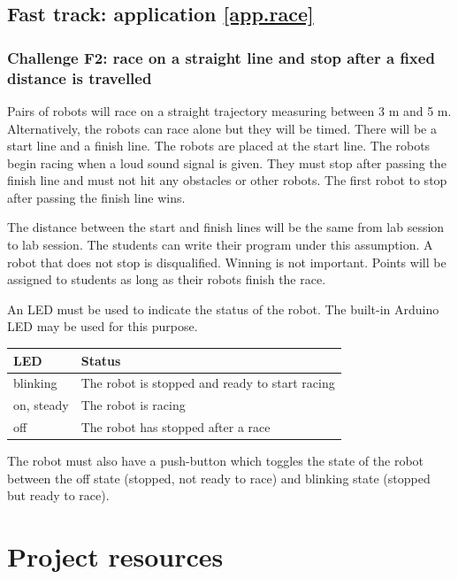 \documentclass[12pt]{book}
\begin{document}
\section{Fast track: application \ref{app.race}}

\subsection{Challenge F2: race on a straight line and stop after a fixed distance is travelled}

Pairs of robots will race on a straight trajectory measuring between 3 m and 5 m. Alternatively, the robots can race alone but they will be timed. There will be a start line and a finish line. The robots are placed at the start line. The robots begin racing when a loud sound signal is given. They must stop after passing the finish line and must not hit any obstacles or other robots. The first robot to stop after passing the finish line wins.

The distance between the start and finish lines will be the same from lab session to lab session. The students can write their program under this assumption. A robot that does not stop is disqualified. Winning is not important. Points will be assigned to students as long as their robots finish the race. 

An LED must be used to indicate the status of the robot. The built-in Arduino LED may be used for this purpose.

\smallskip
\begin{tabular}{l p{8cm}}
  \toprule
  LED & Status \\
  \midrule
  blinking & The robot is stopped and ready to start racing \\
  on, steady & The robot is racing \\
  off & The robot has stopped after a race \\
  \bottomrule
\end{tabular}
\smallskip

  The robot must also have a push-button which toggles the state of the robot between the off state (stopped, not ready to race) and blinking state (stopped but ready to race).



\chapter{Project resources}\label{resource.ch}
\end{document}
